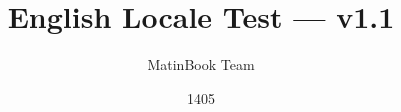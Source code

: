 
\documentclass{matinbook}

\title{English Locale Test — v1.1}
\author{MatinBook Team}
\date{1405}



\begin{latin}

\maketitle

\tableofcontents

\chapter{English Locale Verification}
\label{chap:test-en}

This document verifies the English localization of \texttt{en-US}.

\section{Structural Names}
\label{sec:structure-names}

\begin{itemize}
    \item \verb|\contentsname|: \contentsname
    \item \verb|\listfigurename|: \listfigurename
    \item \verb|\listtablename|: \listtablename
    \item \verb|\bibname|: \bibname
    \item \verb|\indexname|: \indexname
    \item \verb|\chaptername|: \chaptername
    \item \verb|\appendixname|: \appendixname
    \item \verb|\proofname|: \proofname
    \item \verb|\abstractname|: \abstractname
    \item \verb|\figurename|: \figurename
    \item \verb|\tablename|: \tablename
    \item \verb|\partname|: \partname
    \item \verb|\refname|: \refname
\end{itemize}


\end{latin}
